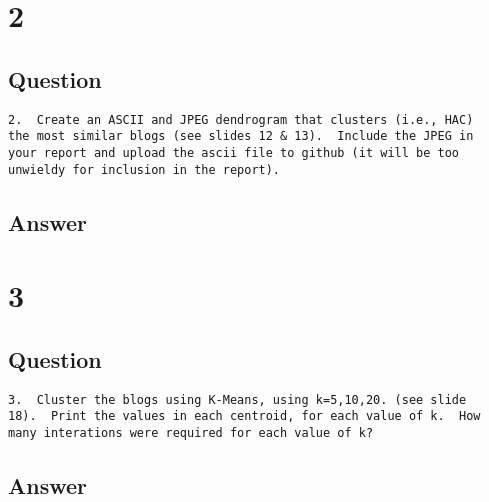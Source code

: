 \documentclass[letterpaper,11pt]{article}
\begin{document}
\clearpage


\section*{2}

\subsection*{Question}

\begin{verbatim}
2.  Create an ASCII and JPEG dendrogram that clusters (i.e., HAC)
the most similar blogs (see slides 12 & 13).  Include the JPEG in
your report and upload the ascii file to github (it will be too
unwieldy for inclusion in the report).
\end{verbatim}

\subsection*{Answer}





\clearpage


\section*{3}

\subsection*{Question}

\begin{verbatim}
3.  Cluster the blogs using K-Means, using k=5,10,20. (see slide
18).  Print the values in each centroid, for each value of k.  How
many interations were required for each value of k?
\end{verbatim}

\subsection*{Answer}
\end{document}
